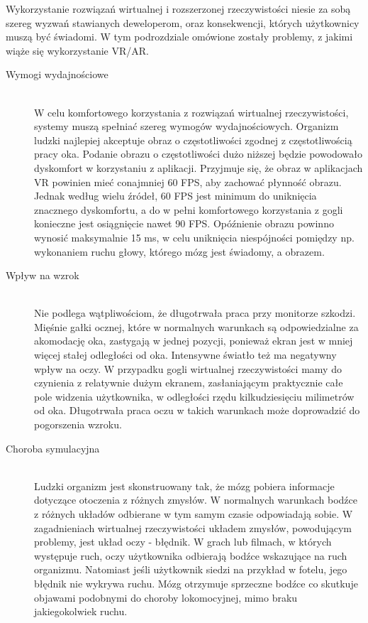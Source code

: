 \documentclass[a4paper,11pt,twoside]{report}
\theoremstyle{definition}
\begin{document}
Wykorzystanie rozwiązań wirtualnej i rozszerzonej rzeczywistości niesie za sobą szereg wyzwań stawianych deweloperom, oraz konsekwencji, których użytkownicy muszą być świadomi. W tym podrozdziale omówione zostały problemy, z jakimi wiąże się wykorzystanie VR/AR\cite{VRdifficulties}.

\begin{description}
\item [Wymogi wydajnościowe] \hfill \\
W celu komfortowego korzystania z rozwiązań wirtualnej rzeczywistości, systemy muszą spełniać szereg wymogów wydajnościowych. Organizm ludzki najlepiej akceptuje obraz o częstotliwości zgodnej z częstotliwością pracy oka. Podanie obrazu o częstotliwości dużo niższej będzie powodowało dyskomfort w korzystaniu z aplikacji. Przyjmuje się, że obraz w aplikacjach VR powinien mieć conajmniej 60 FPS, aby zachować płynność obrazu. Jednak według wielu źródeł, 60 FPS jest minimum do uniknięcia znacznego dyskomfortu, a do w pełni komfortowego korzystania z gogli konieczne jest osiągnięcie nawet 90 FPS\cite{VRframesPerSecond}. Opóźnienie obrazu powinno wynosić maksymalnie 15 ms\cite{VRlatency}, w celu uniknięcia niespójności pomiędzy np. wykonaniem ruchu głowy, którego mózg jest świadomy, a obrazem.
\item [Wpływ na wzrok] \hfill \\
Nie podlega wątpliwościom, że długotrwała praca przy monitorze szkodzi. Mięśnie gałki ocznej, które w normalnych warunkach są odpowiedzialne za akomodację oka, zastygają w jednej pozycji, ponieważ ekran jest w mniej więcej stałej odległości od oka. Intensywne światło też ma negatywny wpływ na oczy. W przypadku gogli wirtualnej rzeczywistości mamy do czynienia z relatywnie dużym ekranem, zasłaniającym praktycznie całe pole widzenia użytkownika, w odległości rzędu kilkudziesięciu milimetrów od oka. Długotrwała praca oczu w takich warunkach może doprowadzić do pogorszenia wzroku.
\item [Choroba symulacyjna] \hfill \\
Ludzki organizm jest skonstruowany tak, że mózg pobiera informacje dotyczące otoczenia z różnych zmysłów. W normalnych warunkach bodźce z różnych układów odbierane w tym samym czasie odpowiadają sobie. W zagadnieniach wirtualnej rzeczywistości układem zmysłów, powodującym problemy, jest układ oczy - błędnik. W grach lub filmach, w których występuje ruch, oczy użytkownika odbierają bodźce wskazujące na ruch organizmu. Natomiast jeśli użytkownik siedzi na przykład w fotelu, jego błędnik nie wykrywa ruchu. Mózg otrzymuje sprzeczne bodźce co skutkuje objawami podobnymi do choroby lokomocyjnej, mimo braku jakiegokolwiek ruchu.\cite{VRsickness}

\end{description}
\end{document}
